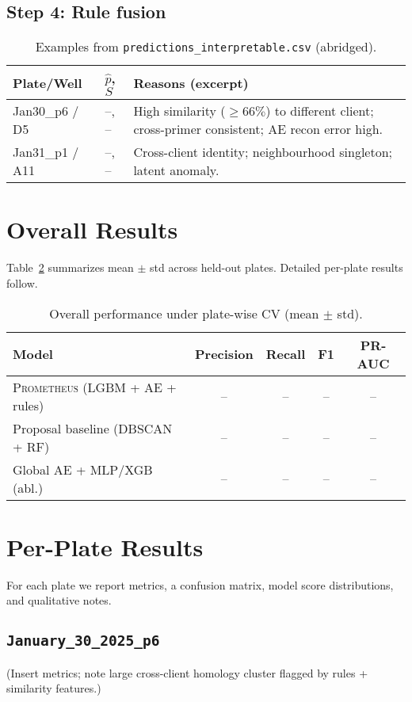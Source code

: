 \subsection{Step 4: Rule fusion}
\begin{table}[H]
\centering
\caption{Examples from \texttt{predictions\_interpretable.csv} (abridged).}
\label{tab:step4_examples}
\begin{tabular}{|l|l|p{8.2cm}|}
\hline
\textbf{Plate/Well} & \textbf{$\hat p$, $S$} & \textbf{Reasons (excerpt)} \\\hline
Jan30\_p6 / D5 & --, -- & High similarity ($\geq 66\%$) to different client; cross-primer consistent; AE recon error high. \\\hline
Jan31\_p1 / A11 & --, -- & Cross-client identity; neighbourhood singleton; latent anomaly. \\\hline
\end{tabular}
\end{table}

\section{Overall Results}
\label{sec:overall_results}
Table~\ref{tab:overall_metrics} summarizes mean $\pm$ std across held-out plates. Detailed per-plate results follow.

\begin{table}[H]\centering
\caption{Overall performance under plate-wise CV (mean $\pm$ std).}
\label{tab:overall_metrics}
\begin{tabular}{|l|c|c|c|c|}
\hline
Model & Precision & Recall & F1 & PR-AUC \\ \hline
\textsc{Prometheus} (LGBM + AE + rules) & -- & -- & -- & -- \\ \hline
Proposal baseline (DBSCAN + RF) & -- & -- & -- & -- \\ \hline
Global AE + MLP/XGB (abl.) & -- & -- & -- & -- \\ \hline
\end{tabular}
\end{table}

\section{Per-Plate Results}
\label{sec:per_plate}
For each plate we report metrics, a confusion matrix, model score distributions, and qualitative notes.

\subsection{\texttt{January\_30\_2025\_p6}}
(Insert metrics; note large cross-client homology cluster flagged by rules + similarity features.)

